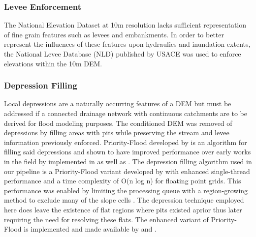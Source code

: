 \subsubsection{Levee Enforcement}
%
The National Elevation Dataset at 10m resolution lacks sufficient representation of fine grain features such as levees and embankments.
In order to better represent the influences of these features upon hydraulics and inundation extents, the National Levee Database (NLD) published by USACE was used to enforce elevations within the 10m DEM.
%
%
\subsubsection{Depression Filling}
%
Local depressions are a naturally occurring features of a DEM but must be addressed if a connected drainage network with continuous catchments are to be derived for flood modeling purposes.
The conditioned DEM was removed of depressions by filling areas with pits while preserving the stream and levee information previously enforced.
Priority-Flood developed by  is an algorithm for filling said depressions and shown to have improved performance over early works in the field by  implemented in  as well as .
The depression filling algorithm used in our pipeline is a Priority-Flood variant developed by \cite{zhou2016efficient} with enhanced single-thread performance and a time complexity of O(n log n) for floating point grids.
This performance was enabled by limiting the processing queue with a region-growing method to exclude many of the slope cells \cite{zhou2016efficient}.
The depression technique employed here does leave the existence of flat regions where pits existed aprior thus later requiring the need for resolving these flats.
The enhanced variant of Priority-Flood is implemented and made available by  and .
%
